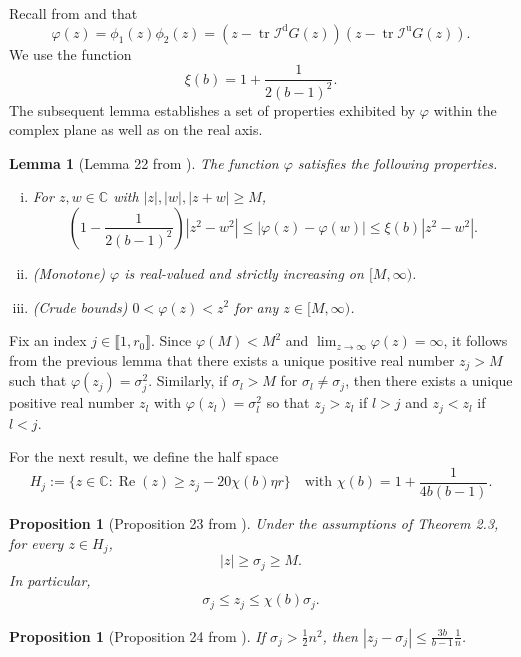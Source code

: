\documentclass[reqno]{amsart}
\DeclareMathOperator{\tr}{tr}
\renewcommand\Re{\operatorname{Re}}
\theoremstyle{plain}
\newtheorem{proposition}[theorem]{Proposition}
\newtheorem{lemma}[theorem]{Lemma}
\theoremstyle{definition}
\begin{document}
Recall from \cite[Eq. (34)]{Wang24} and \cite[Eq. (27)]{Wang24} that 
\[ \varphi(z)= \phi_1(z)\phi_2(z)=(z-\tr \mathcal I^{\mathrm d} G(z))(z-\tr \mathcal I^{\mathrm u} G(z)).\]We use the function 
\begin{equation}\label{eq:xib}
\xi(b)=1+\frac{1}{2(b-1)^2}.
\end{equation}
The subsequent lemma establishes a set of properties exhibited by $\varphi$ within the complex plane as well as on the real axis. %
\begin{lemma}[Lemma 22 from \cite{OVW22}] \label{lemma:varphi}
The function $\varphi$ satisfies the following properties.  
\begin{enumerate}[(i)]
\item  For $z, w \in \mathbb{C}$ with $|z|, |w|, |z+w| \ge M$, 
\begin{equation} \label{eq:lipschitz}
	\left(1-\frac{1}{2(b-1)^2} \right) |z^2-w^2| \leq | \varphi(z) - \varphi(w)| \leq \xi(b) |z^2- w^2|.
\end{equation}
\item (Monotone) $\varphi$ is real-valued and strictly increasing on $[M, \infty)$.  
\item \label{item:crude} (Crude bounds) $0 < \varphi(z) < z^2$ for any $z \in [M, \infty)$.  
\end{enumerate}
\end{lemma}

 
Fix an index $j\in \llbracket 1, r_0\rrbracket$. Since $\varphi(M) < M^2$ and $\lim_{z \to \infty} \varphi(z) = \infty$, it follows from the previous lemma that there exists a unique positive real number $z_j > M$ such that $\varphi(z_j) =\sigma_j^2$.  Similarly, if $\sigma_{l} > M$ for  $\sigma_l\neq \sigma_j$, then there exists a unique positive real number $z_{l}$ with $\varphi(z_{l}) = \sigma_{l}^2$ so that $z_j > z_{l}$ if $l>j$ and $z_j< z_l$ if $l<j$.   

For the next result, we define the half space 
\[ H_j := \{z \in \mathbb{C} : \Re(z) \geq z_j - 20\chi(b) \eta r\} \quad \text{with } \chi(b)=1+\frac{1}{4b(b-1)}.\] 
\begin{proposition}[Proposition 23 from \cite{OVW22}] \label{prop:H}
Under the assumptions of Theorem 2.3, for every $z \in H_j$, 
\[ |z| \geq \sigma_j \ge M. \]
In particular, 
\begin{align}\label{eq:zjbd}
\sigma_j \le z_j \le \chi(b) \sigma_j. 
\end{align}
\end{proposition} 
\begin{proposition}[Proposition 24 from \cite{OVW22}]\label{prop:bigbound}
If $\sigma_j> \frac{1}{2}n^2$, then $|z_j - \sigma_j | \le \frac{3b}{b-1}\frac{1}{n}$.
\end{proposition}
\end{document}
